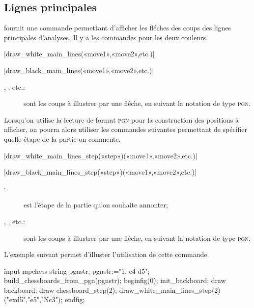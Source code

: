 \documentclass[french]{ltxdoc}
\begin{document}
\subsection{Lignes principales}

\mpchess fournit une commande permettant d’afficher les fléches des coups des
lignes principales d’analyses. Il y a les commandes pour les deux couleurs. 

\commande|draw_white_main_lines(«move1»,«move2»,etc.)|\smallskip

\commande|draw_black_main_lines(«move1»,«move2»,etc.)|\smallskip

\begin{description}
\item[, , etc.:] sont les coups à illustrer par une
flêche, en suivant la notation de type \textsc{pgn}.
\end{description}
Lorsqu’on utilise la lecture de format \textsc{pgn} pour la construction des
positions à afficher, on pourra alors utiliser les commandes suivantes
permettant de spécifier quelle étape de la partie on commente. 

\commande|draw_white_main_lines_step(«step»)(«move1»,«move2»,etc.)|\smallskip

\commande|draw_black_main_lines_step(«step»)(«move1»,«move2»,etc.)|\smallskip

\begin{description}
  \item[:] est l’étape de la partie qu’on souhaite annonter; 
\item[, , etc.:] sont les coups à illustrer par une
flêche, en suivant la notation de type \textsc{pgn}.
\end{description}

L’exemple suivant permet d’illuster l’utilisation de cette commande. 

\begin{ExempleMP}
input mpchess
string pgnstr;
pgnstr:="1. e4 d5";
build_chessboards_from_pgn(pgnstr);
beginfig(0);
init_backboard;
draw backboard;
draw chessboard_step(2);
draw_white_main_lines_step(2)("exd5","e5","Nc3");
endfig;
\end{ExempleMP}
\end{document}
